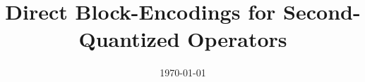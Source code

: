 






\title{Direct Block-Encodings for Second-Quantized Operators}


\date{\today} 


 

\maketitle











\appendix











